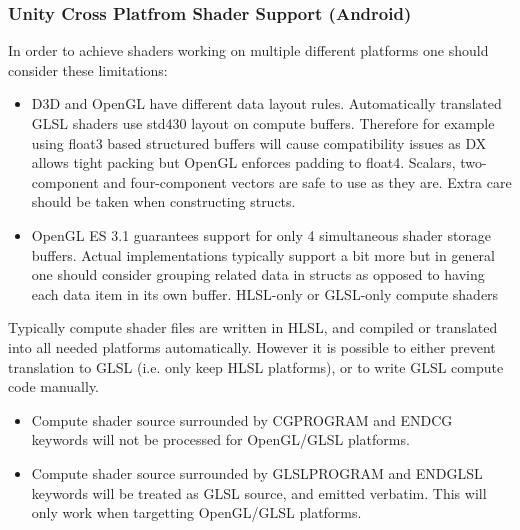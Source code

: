 \documentclass[a4paper,10pt,twoside]{article}
\begin{document}
\subsubsection{Unity Cross Platfrom Shader Support (Android)}
In order to achieve shaders working on multiple different platforms one should consider these limitations:

\begin{itemize}
\item 
D3D and OpenGL have different data layout rules. Automatically translated GLSL shaders use std430 layout on compute buffers. Therefore for example using float3 based structured buffers will cause compatibility issues as DX allows tight packing but OpenGL enforces padding to float4. Scalars, two-component and four-component vectors are safe to use as they are. Extra care should be taken when constructing structs.
\item 
OpenGL ES 3.1 guarantees support for only 4 simultaneous shader storage buffers. Actual implementations typically support a bit more but in general one should consider grouping related data in structs as opposed to having each data item in its own buffer.
HLSL-only or GLSL-only compute shaders

\end{itemize}

Typically compute shader files are written in HLSL, and compiled or translated into all needed platforms automatically. However it is possible to either prevent translation to GLSL (i.e. only keep HLSL platforms), or to write GLSL compute code manually.
\begin{itemize}
\item Compute shader source surrounded by CGPROGRAM and ENDCG keywords will not be processed for OpenGL/GLSL platforms.
\item Compute shader source surrounded by GLSLPROGRAM and ENDGLSL keywords will be treated as GLSL source, and emitted verbatim. This will only work when targetting OpenGL/GLSL platforms.
\end{itemize}
\pagebreak
\end{document}

